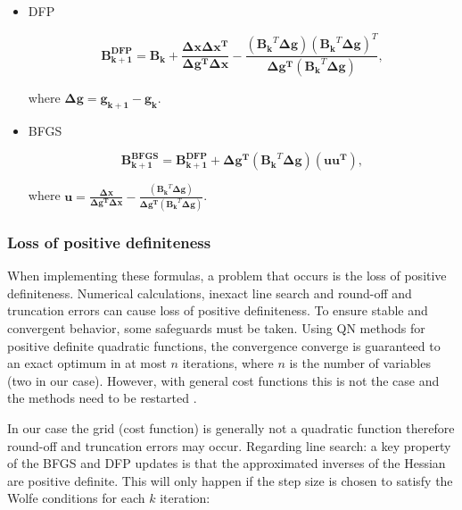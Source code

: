 \begin{itemize}
	\item DFP
	
	\begin{equation}
	 \mathbf{B_{k+1}^{DFP}} =  \mathbf{B_k} + 	\frac{\mathbf{\Delta x}   \mathbf{\Delta x^{T}}}		
	 {\mathbf{\Delta g^{T}}  \mathbf{\Delta x}  } -  \frac{(\mathbf{B_{k}}^{T}  \mathbf{\Delta g}) (\mathbf{B_{k}}^{T}  \mathbf{\Delta g})^{T}  }
	 {\mathbf{\Delta g^{T}} (\mathbf{B_{k}}^{T}  \mathbf{\Delta g})   },
	 \label{eq:DFP}
	\end{equation}
	
	where $\mathbf{\Delta g} = \mathbf{g_{k+1} }- \mathbf{g_k} $.
	
	\item BFGS
	
	\begin{equation}
	\mathbf{B_{k+1}^{BFGS}} =  \mathbf{B_{k+1}^{DFP}} + \mathbf{\Delta g^{T}}(\mathbf{B_{k}}^{T}  \mathbf{\Delta g})(\mathbf{u}  \mathbf{u^{T}})	,
	\end{equation}	
	
	where $\mathbf{u} = \frac{\mathbf{\Delta x}}		
	{\mathbf{\Delta g^{T}}  \mathbf{\Delta x}} - \frac{(\mathbf{B_{k}}^{T}  \mathbf{\Delta g})   }
	{\mathbf{\Delta g^{T}} (\mathbf{B_{k}}^{T}  \mathbf{\Delta g})   }$.
	

\end{itemize}


\subsubsection{Loss of positive definiteness}
\label{subsubsec:loss_pdness}

When implementing these formulas, a problem that occurs is the loss of positive definiteness. Numerical calculations, inexact line search and round-off and truncation errors can cause loss of positive definiteness. To ensure stable and convergent behavior, some safeguards must be taken. 
Using QN methods for positive definite quadratic functions, the convergence converge is guaranteed to an exact optimum in at most $n$ iterations, where $n$ is the number of variables (two in our case).
However, with general cost functions this is not the case and the methods need to be restarted   \cite{intro_opt_design}.


In our case the grid (cost function) is generally not a quadratic function therefore round-off and truncation errors may occur. 
Regarding line search: a key property of the BFGS and DFP updates is that the approximated inverses of the Hessian are positive definite. This will only happen if the step size is chosen to satisfy the Wolfe conditions for each $k$ iteration:



